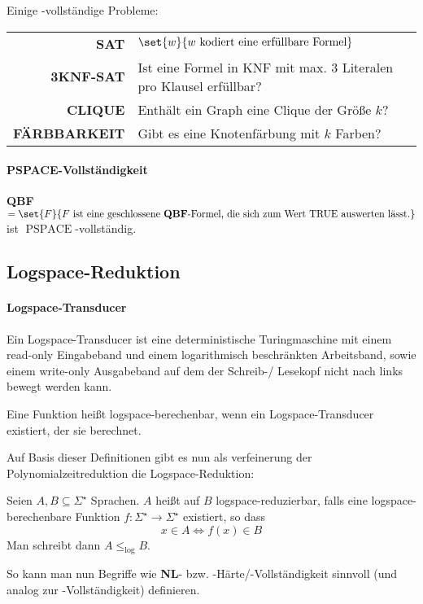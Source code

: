 Einige \npoly-vollständige Probleme:
\begin{center}
	\begin{tabular}{r|l}
		\textbf{SAT} & $\set{w}{w\text{ kodiert eine erfüllbare Formel}}$\\
		\textbf{3KNF-SAT} & Ist eine Formel in KNF mit max. 3 Literalen pro Klausel erfüllbar?\\
		\textbf{CLIQUE} & Enthält ein Graph eine Clique der Größe $k$?\\
		\textbf{FÄRBBARKEIT} & Gibt es eine Knotenfärbung mit $k$ Farben?\\
	\end{tabular}
\end{center}

\paragraph{PSPACE-Vollständigkeit}
\textbf{QBF} $=\set{F}{F\text{ ist eine geschlossene \textbf{QBF}-Formel, die sich zum Wert TRUE auswerten lässt.}}$ ist $\operatorname{PSPACE}$-vollständig.

\subsection{Logspace-Reduktion}
\paragraph{Logspace-Transducer}
Ein Logspace-Transducer ist eine deterministische Turingmaschine mit einem read-only Eingabeband und einem logarithmisch beschränkten Arbeitsband, sowie einem write-only Ausgabeband auf dem der Schreib-/ Lesekopf nicht nach links bewegt werden kann.

Eine Funktion heißt logspace-berechenbar, wenn ein Logspace-Transducer existiert, der sie berechnet.

Auf Basis dieser Definitionen gibt es nun als verfeinerung der Polynomialzeitreduktion die Logspace-Reduktion:

Seien $A,B\subseteq \Sigma^\star$ Sprachen. $A$ heißt auf $B$ logspace-reduzierbar, falls eine logspace-berechenbare Funktion $f:\Sigma^\star\rightarrow\Sigma^\star$ existiert, so dass
\begin{equation*}
	x\in A\Leftrightarrow f(x)\in B
\end{equation*}
Man schreibt dann $A\leq_{\log} B$.

So kann man nun Begriffe wie \textbf{NL}- bzw. \poly-Härte/-Vollständigkeit sinnvoll (und analog zur \npoly-Vollständigkeit) definieren.

